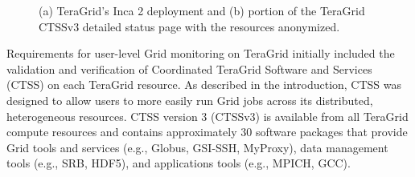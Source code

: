 \documentclass[times,10pt,twocolumn]{article}
\begin{document}
\begin{figure}[tbp]
  \caption{\label{tg_deploy_fig}\label{status_page_fig} (a) TeraGrid's Inca 2
  deployment and (b) portion of the TeraGrid CTSSv3 detailed status page with
  the resources anonymized.}
\end{figure}

Requirements for user-level Grid monitoring on TeraGrid initially included the
validation and verification of Coordinated TeraGrid Software and Services (CTSS) 
on each TeraGrid resource.  As described in the introduction, CTSS was designed to
allow users to more easily run Grid jobs across its distributed, heterogeneous
resources.  CTSS version 3 (CTSSv3) is available from all TeraGrid compute
resources and contains approximately 30 software packages that provide
Grid tools and services (e.g., Globus, GSI-SSH, MyProxy), data management
tools (e.g., SRB, HDF5), and applications tools (e.g., MPICH, GCC).
\end{document}
